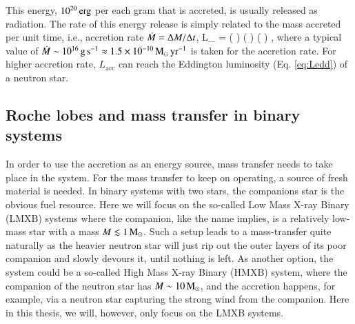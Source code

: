 This energy, $10^{20} \, \mathrm{erg}$ per each gram that is accreted, is usually released as radiation.
The rate of this energy release is simply related to the mass accreted per unit time, i.e., accretion rate $\dot{M} = \Delta M/ \Delta t$, 
\be
L_{} = \Mdot {} \approx {} \left(  \right) \left(  \right) \left(  \right) \ergs,
\ee
where a typical value of $\dot{M} \sim 10^{16} \, \mathrm{g}\,\mathrm{s}^{-1} \approx 1.5 \times 10^{-10} \, \mathrm{M}_{\odot}\,\mathrm{yr}^{-1}$ is taken for the accretion rate.
For higher accretion rate, $L_{\mathrm{acc}}$ can reach the Eddington luminosity (Eq. \eqref{eq:Ledd}) of a neutron star.



\subsection{Roche lobes and mass transfer in binary systems}

In order to use the accretion as an energy source, mass transfer needs to take place in the system.
For the mass transfer to keep on operating, a source of fresh material is needed.
In binary systems with two stars, the companions star is the obvious fuel resource.
Here we will focus on the so-called Low Mass X-ray Binary (LMXB) systems where the companion, like the name implies, is a relatively low-mass star with a mass $M \lesssim 1 \, \mathrm{M}_{\odot}$.\cite{TH06}
Such a setup leads to a mass-transfer quite naturally as the heavier neutron star will just rip out the outer layers of its poor companion and slowly devours it, until nothing is left.
As another option, the system could be a so-called High Mass X-ray Binary (HMXB) system, where the companion of the neutron star has $M \sim 10\, \mathrm{M}_{\odot}$, and the accretion happens, for example, via a neutron star capturing the strong wind from the companion.
Here in this thesis, we will, however, only focus on the LMXB systems.


